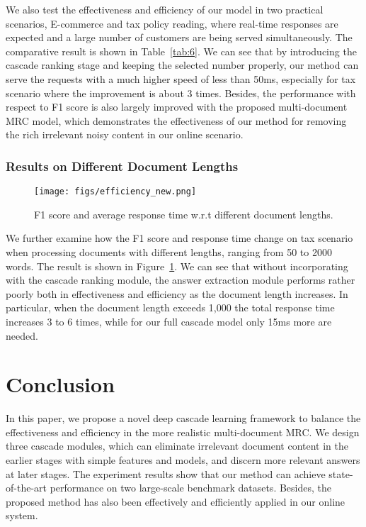\documentclass[letterpaper]{article} \usepackage{aaai19}  \usepackage{graphicx}
\begin{document}
We also test the effectiveness and efficiency of our model in two practical scenarios, E-commerce and tax policy reading, where real-time responses are expected and a large number of customers are being served simultaneously. The comparative result is shown in Table~\ref{tab:6}. We can see that by introducing the cascade ranking stage and keeping the selected number properly, our method can serve the requests with a much higher speed of less than 50ms, especially for tax scenario where the improvement is about 3 times. Besides, the performance with respect to F1 score is also largely improved with the proposed multi-document MRC model, which demonstrates the effectiveness of our method for removing the rich irrelevant noisy content in our online scenario.



\subsubsection{Results on Different Document Lengths}
\begin{figure}
\centering
\texttt{[image: figs/efficiency\_new.png]} \vspace{-4mm}
\caption{F1 score and average response time w.r.t different document lengths.} \vspace{-2mm}
\label{fig:retrieval_efficiency} \vspace{-3mm}
\end{figure}

We further examine how the F1 score and response time change on tax scenario when processing documents with different lengths, ranging from 50 to 2000 words. The result is shown in Figure~\ref{fig:retrieval_efficiency}. We can see that without incorporating with the cascade ranking module, the answer extraction module performs rather poorly both in effectiveness and efficiency as the document length increases. In particular, when the document length exceeds 1,000 the total response time increases 3 to 6 times, while for our full cascade model only 15ms more are needed. 

\section{Conclusion}

In this paper, we propose a novel deep cascade learning framework to balance the effectiveness and efficiency in the more realistic multi-document MRC. We design three cascade modules, which can eliminate irrelevant document content in the earlier stages with simple features and models, and discern more relevant answers at later stages. The experiment results show that our method can achieve state-of-the-art performance on two large-scale benchmark datasets. Besides, the proposed method has also been effectively and efficiently applied in our online system.






\end{document}
